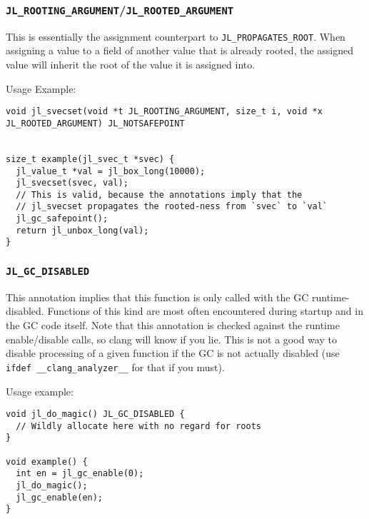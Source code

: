 \hypertarget{78198301944071640}{}


\subsubsection{\texttt{JL\_ROOTING\_ARGUMENT}/\texttt{JL\_ROOTED\_ARGUMENT}}



This is essentially the assignment counterpart to \texttt{JL\_PROPAGATES\_ROOT}. When assigning a value to a field of another value that is already rooted, the assigned value will inherit the root of the value it is assigned into.



Usage Example:




\begin{lstlisting}
void jl_svecset(void *t JL_ROOTING_ARGUMENT, size_t i, void *x JL_ROOTED_ARGUMENT) JL_NOTSAFEPOINT


size_t example(jl_svec_t *svec) {
  jl_value_t *val = jl_box_long(10000);
  jl_svecset(svec, val);
  // This is valid, because the annotations imply that the
  // jl_svecset propagates the rooted-ness from `svec` to `val`
  jl_gc_safepoint();
  return jl_unbox_long(val);
}
\end{lstlisting}



\hypertarget{9078058200292228414}{}


\subsubsection{\texttt{JL\_GC\_DISABLED}}



This annotation implies that this function is only called with the GC runtime-disabled. Functions of this kind are most often encountered during startup and in the GC code itself. Note that this annotation is checked against the runtime enable/disable calls, so clang will know if you lie. This is not a good way to disable processing of a given function if the GC is not actually disabled (use \texttt{ifdef \_\_clang\_analyzer\_\_} for that if you must).



Usage example:




\begin{lstlisting}
void jl_do_magic() JL_GC_DISABLED {
  // Wildly allocate here with no regard for roots
}

void example() {
  int en = jl_gc_enable(0);
  jl_do_magic();
  jl_gc_enable(en);
}
\end{lstlisting}



